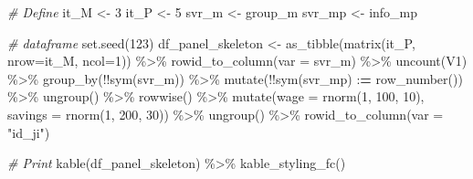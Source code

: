 \documentclass[
]{book}
\newenvironment{Shaded}{\begin{snugshade}}{\end{snugshade}}
\newcommand{\AttributeTok}[1]{\textcolor[rgb]{0.77,0.63,0.00}{#1}}
\newcommand{\CommentTok}[1]{\textcolor[rgb]{0.56,0.35,0.01}{\textit{#1}}}
\newcommand{\DecValTok}[1]{\textcolor[rgb]{0.00,0.00,0.81}{#1}}
\newcommand{\ErrorTok}[1]{\textcolor[rgb]{0.64,0.00,0.00}{\textbf{#1}}}
\newcommand{\FunctionTok}[1]{\textcolor[rgb]{0.00,0.00,0.00}{#1}}
\newcommand{\NormalTok}[1]{#1}
\newcommand{\OtherTok}[1]{\textcolor[rgb]{0.56,0.35,0.01}{#1}}
\newcommand{\SpecialCharTok}[1]{\textcolor[rgb]{0.00,0.00,0.00}{#1}}
\newcommand{\StringTok}[1]{\textcolor[rgb]{0.31,0.60,0.02}{#1}}
\begin{document}
\begin{Shaded}
\begin{Highlighting}[]
\CommentTok{\# Define}
\NormalTok{it\_M }\OtherTok{\textless{}{-}} \DecValTok{3}
\NormalTok{it\_P }\OtherTok{\textless{}{-}} \DecValTok{5}
\NormalTok{svr\_m }\OtherTok{\textless{}{-}} \StringTok{\textquotesingle{}group\_m\textquotesingle{}}
\NormalTok{svr\_mp }\OtherTok{\textless{}{-}} \StringTok{\textquotesingle{}info\_mp\textquotesingle{}}

\CommentTok{\# dataframe}
\FunctionTok{set.seed}\NormalTok{(}\DecValTok{123}\NormalTok{)}
\NormalTok{df\_panel\_skeleton }\OtherTok{\textless{}{-}} \FunctionTok{as\_tibble}\NormalTok{(}\FunctionTok{matrix}\NormalTok{(it\_P, }\AttributeTok{nrow=}\NormalTok{it\_M, }\AttributeTok{ncol=}\DecValTok{1}\NormalTok{)) }\SpecialCharTok{\%\textgreater{}\%}
  \FunctionTok{rowid\_to\_column}\NormalTok{(}\AttributeTok{var =}\NormalTok{ svr\_m) }\SpecialCharTok{\%\textgreater{}\%}
  \FunctionTok{uncount}\NormalTok{(V1) }\SpecialCharTok{\%\textgreater{}\%}
  \FunctionTok{group\_by}\NormalTok{(}\SpecialCharTok{!!}\FunctionTok{sym}\NormalTok{(svr\_m)) }\SpecialCharTok{\%\textgreater{}\%} \FunctionTok{mutate}\NormalTok{(}\SpecialCharTok{!!}\FunctionTok{sym}\NormalTok{(svr\_mp) }\SpecialCharTok{:}\ErrorTok{=} \FunctionTok{row\_number}\NormalTok{()) }\SpecialCharTok{\%\textgreater{}\%}
  \FunctionTok{ungroup}\NormalTok{() }\SpecialCharTok{\%\textgreater{}\%}
  \FunctionTok{rowwise}\NormalTok{() }\SpecialCharTok{\%\textgreater{}\%} \FunctionTok{mutate}\NormalTok{(}\AttributeTok{wage =} \FunctionTok{rnorm}\NormalTok{(}\DecValTok{1}\NormalTok{, }\DecValTok{100}\NormalTok{, }\DecValTok{10}\NormalTok{), }
                       \AttributeTok{savings =} \FunctionTok{rnorm}\NormalTok{(}\DecValTok{1}\NormalTok{, }\DecValTok{200}\NormalTok{, }\DecValTok{30}\NormalTok{)) }\SpecialCharTok{\%\textgreater{}\%}
  \FunctionTok{ungroup}\NormalTok{() }\SpecialCharTok{\%\textgreater{}\%} 
  \FunctionTok{rowid\_to\_column}\NormalTok{(}\AttributeTok{var =} \StringTok{"id\_ji"}\NormalTok{)}

\CommentTok{\# Print}
\FunctionTok{kable}\NormalTok{(df\_panel\_skeleton) }\SpecialCharTok{\%\textgreater{}\%} \FunctionTok{kable\_styling\_fc}\NormalTok{()}
\end{Highlighting}
\end{Shaded}
\end{document}
